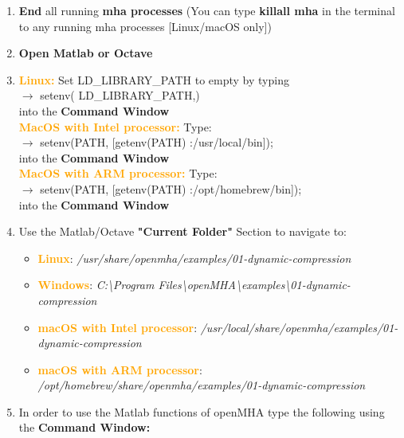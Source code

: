 \documentclass[11pt,a4paper,twoside]{article}
\newcommand{\+}{\discretionary{\mbox{\scriptsize$\hookleftarrow$}}{}{}}
\begin{document}
{{\begin{enumerate}
\item \textbf{End} all running \textbf{mha processes} (You can type \textbf{killall mha} in the terminal to any running mha processes [Linux/macOS only])
\item \textbf{Open Matlab or Octave}
\item \textcolor{orange}{\textbf{Linux:}} Set LD\_LIBRARY\_PATH to empty by typing \\ {\ttfamily
  $\rightarrow$ setenv(\textquotesingle
  LD\_LIBRARY\_PATH\textquotesingle,\textquotesingle\textquotesingle)} \\
  into the \textbf{Command Window} \\
\textcolor{orange}{\textbf{MacOS with Intel processor:}} Type: \\{\ttfamily $\rightarrow$ setenv(\textquotesingle PATH\textquotesingle, [getenv(\textquotesingle PATH\textquotesingle) \textquotesingle :/usr/local/bin\textquotesingle]);} \\
into the \textbf{Command Window} \\  
\textcolor{orange}{\textbf{MacOS with ARM processor:}} Type: \\{\ttfamily $\rightarrow$ setenv(\textquotesingle PATH\textquotesingle, [getenv(\textquotesingle PATH\textquotesingle) \textquotesingle :/opt/homebrew/bin\textquotesingle]);} \\
into the \textbf{Command Window} \\  
\item Use the Matlab/Octave \textbf{"Current Folder"} Section to navigate to:

\begin{itemize}
\item \textcolor{orange}{\textbf{Linux}}: \textit{/usr/share/openmha/examples/01-dynamic-compression} 
\item \textcolor{orange}{\textbf{Windows}}: \textit{C:\textbackslash Program Files\textbackslash openMHA\textbackslash examples\textbackslash 01-dynamic-compression}
\item \textcolor{orange}{\textbf{macOS with Intel processor}}: \textit{/usr/local/share/openmha/examples/01-dynamic-compression} 
\item \textcolor{orange}{\textbf{macOS with ARM processor}}: \textit{/opt/homebrew/share/openmha/examples/01-dynamic-compression} 
\end{itemize}

\item In order to use the Matlab functions of openMHA type the following using the \textbf{Command Window:} 


\end{enumerate}}}
\end{document}
